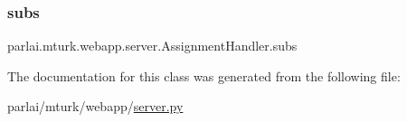 \subsubsection{\texorpdfstring{subs}{subs}}
{\footnotesize\ttfamily parlai.\+mturk.\+webapp.\+server.\+Assignment\+Handler.\+subs}



The documentation for this class was generated from the following file\+:\begin{DoxyCompactItemize}
\item 
parlai/mturk/webapp/\hyperlink{server_8py}{server.\+py}\end{DoxyCompactItemize}
